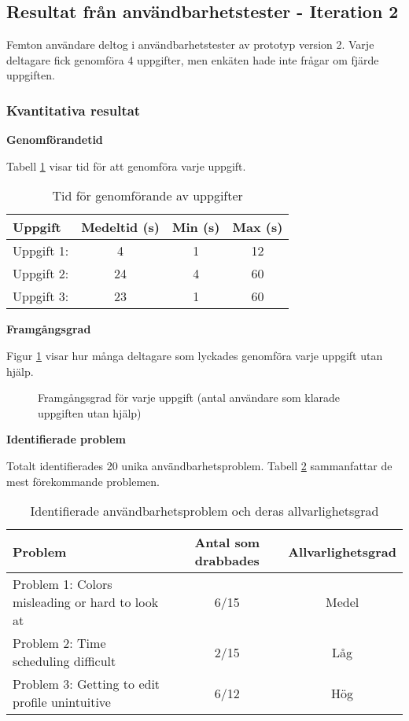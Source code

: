 \subsection{Resultat från användbarhetstester - Iteration 2}

Femton användare deltog i användbarhetstester av prototyp version 2. Varje deltagare fick genomföra 4 uppgifter, men enkäten hade inte frågar om fjärde uppgiften. 


\subsubsection{Kvantitativa resultat}

\textbf{Genomförandetid}

Tabell \ref{tab:tid} visar tid för att genomföra varje uppgift.

\begin{table}[h]
\centering
\begin{tabular}{|l|c|c|c|}
\hline
\textbf{Uppgift} & \textbf{Medeltid (s)} & \textbf{Min (s)} & \textbf{Max (s)} \\
\hline
Uppgift 1:  & 4 & 1 & 12 \\
Uppgift 2:  & 24 & 4 & 60\\
Uppgift 3:  & 23 & 1 & 60\\
\hline
\end{tabular}
\caption{Tid för genomförande av uppgifter}
\label{tab:tid}
\end{table}

\textbf{Framgångsgrad}

Figur \ref{fig:success_rate} visar hur många deltagare som lyckades genomföra varje uppgift utan hjälp.

\begin{figure}[ht]
    \centering
    \caption{Framgångsgrad för varje uppgift (antal användare som klarade uppgiften utan hjälp)}
    \label{fig:success_rate}
\end{figure}

\textbf{Identifierade problem}

Totalt identifierades 20 unika användbarhetsproblem. Tabell \ref{tab:problem} sammanfattar de mest förekommande problemen.
\begin{table}[h]
\centering
\begin{tabular}{|p{6cm}|c|c|}
\hline
\textbf{Problem} & \textbf{Antal som drabbades} & \textbf{Allvarlighetsgrad} \\
\hline
Problem 1: Colors misleading or hard to look at & 6/15 & Medel\\
Problem 2: Time scheduling difficult & 2/15 &  Låg \\
Problem 3: Getting to edit profile unintuitive & 6/12 & Hög\\
\hline
\end{tabular}
\caption{Identifierade användbarhetsproblem och deras allvarlighetsgrad}
\label{tab:problem}
\end{table}


